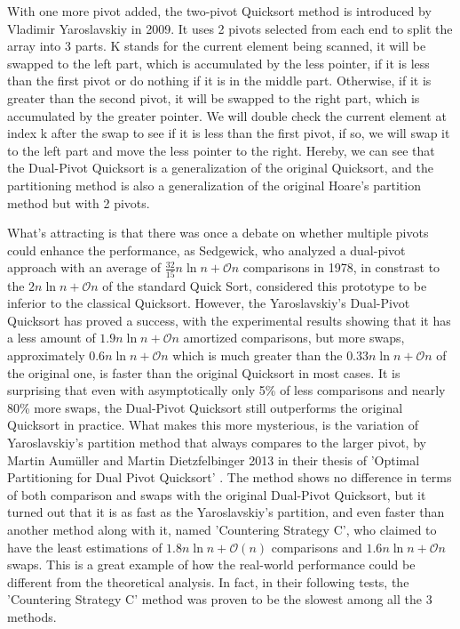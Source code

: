 \documentclass{article}
\newcommand{\bigO}{\mathcal{O}}
\begin{document}
With one more pivot added, the two-pivot Quicksort method is introduced by Vladimir Yaroslavskiy in 2009. It uses 2 pivots selected from each end to split the array into 3 parts.
K stands for the current element being scanned, it will be swapped to the left part, which is accumulated by the less pointer, if it is less than the first pivot or do nothing if it is in the middle part.
Otherwise, if it is greater than the second pivot, it will be swapped to the right part, which is accumulated by the greater pointer.
We will double check the current element at index k after the swap to see if it is less than the first pivot, if so, we will swap it to the left part and move the less pointer to the right.
Hereby, we can see that the Dual-Pivot Quicksort is a generalization of the original Quicksort, and the partitioning method is also a generalization of the original Hoare's partition method but with 2 pivots.

What's attracting is that there was once a debate on whether multiple pivots could enhance the performance, as Sedgewick,
who analyzed a dual-pivot approach with an average of $\frac{32}{15}n \ln n + \bigO{n}$ comparisons in 1978, in constrast to the $2n\ln n + \bigO{n}$ of the standard Quick Sort, considered this prototype to be inferior to the classical Quicksort.
However, the Yaroslavskiy's Dual-Pivot Quicksort has proved a success, with the experimental results showing that it has a less amount of $1.9n\ln n + \bigO{n}$ amortized comparisons, but more swaps,
approximately $0.6n\ln n + \bigO{n}$ which is much greater than the $0.33n\ln n + \bigO{n}$ of the original one, is faster than the original Quicksort in most cases.
It is surprising that even with asymptotically only 5\% of less comparisons and nearly 80\% more swaps, the Dual-Pivot Quicksort still outperforms the original Quicksort in practice.
What makes this more mysterious, is the variation of Yaroslavskiy's partition method that always compares to the larger pivot, by Martin Aumüller and Martin Dietzfelbinger 2013 in their thesis of 'Optimal Partitioning for Dual Pivot Quicksort' \cite{OptimalPartitioningForDualPivotQuicksort}.
The method shows no difference in terms of both comparison and swaps with the original Dual-Pivot Quicksort, but it turned out that it is as fast as the Yaroslavskiy's partition, and even faster than another method along with it, named 'Countering Strategy C', who claimed to have the least 
estimations of $1.8n \ln n + \bigO(n)$ comparisons and $1.6n \ln n + \bigO{n}$ swaps. This is a great example of how the real-world performance could be different from the theoretical analysis. In fact, in their following tests, the 'Countering Strategy C' method was proven to be the slowest among all the 3 methods.
\end{document}
